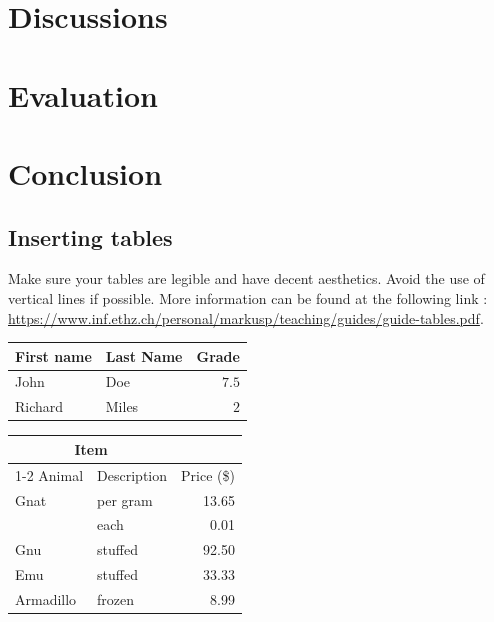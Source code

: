 \documentclass[conference]{IEEEtran}
\begin{document}
\section{Discussions}
\label{sec:discussion}

\section{Evaluation}
\label{sec:evaluation}

\section{Conclusion}
\label{sec:conclusion}



\subsection{Inserting tables}

Make sure your tables are legible and have decent aesthetics. Avoid the use of vertical lines if possible. More information can be found at the following link : \url{https://www.inf.ethz.ch/personal/markusp/teaching/guides/guide-tables.pdf}.

\vspace{0.5cm}
\begin{tabular}{llr}
  \toprule
  First name & Last Name & Grade \\
  \midrule
  John & Doe & $7.5$ \\
  Richard & Miles & $2$ \\
  \bottomrule
  \end{tabular}

  \vspace{0.5cm}

  \begin{tabular}{llr}  
    \toprule
    \multicolumn{2}{c}{Item} \\
    \cmidrule(r){1-2}
    Animal    & Description & Price (\$) \\
    \midrule
    Gnat      & per gram    & 13.65      \\
          &    each     & 0.01       \\
    Gnu       & stuffed     & 92.50      \\
    Emu       & stuffed     & 33.33      \\
    Armadillo & frozen      & 8.99       \\
    \bottomrule
  \end{tabular}
\end{document}
